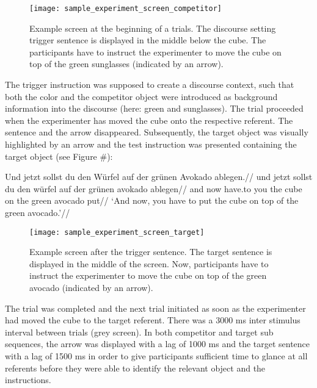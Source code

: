 \documentclass[
]{article}
\begin{document}
\begin{figure}[tbp]

{\centering \texttt{[image: sample\_experiment\_screen\_competitor]} 

}

\caption{Example screen at the beginning of a trials. The discourse setting trigger sentence is displayed in the middle below the cube. The participants have to instruct the experimenter to move the cube on top of the green sunglasses (indicated by an arrow).}\label{fig:image1}
\end{figure}

The trigger instruction was supposed to create a discourse context, such
that both the color and the competitor object were introduced as
background information into the discourse (here: green and sunglasses).
The trial proceeded when the experimenter has moved the cube onto the
respective referent. The sentence and the arrow disappeared.
Subsequently, the target object was visually highlighted by an arrow and
the test instruction was presented containing the target object (see
Figure \#):

\ex \begingl
\glpreamble Und jetzt sollst du den Würfel auf der grünen Avokado ablegen.//
\gla und jetzt sollst du den würfel auf der grünen avokado ablegen//
\glb and now have.to you the cube on the green avocado put//
\glft `And now, you have to put the cube on top of the green avocado.'//
\endgl \xe

\begin{figure}[tbp]

{\centering \texttt{[image: sample\_experiment\_screen\_target]} 

}

\caption{Example screen after the trigger sentence. The target sentence is displayed in the middle of the screen. Now, participants have to instruct the experimenter to move the cube on top of the green avocado (indicated by an arrow).}\label{fig:image2}
\end{figure}

The trial was completed and the next trial initiated as soon as the
experimenter had moved the cube to the target referent. There was a 3000
ms inter stimulus interval between trials (grey screen). In both
competitor and target sub sequences, the arrow was displayed with a lag
of 1000 ms and the target sentence with a lag of 1500 ms in order to
give participants sufficient time to glance at all referents before they
were able to identify the relevant object and the instructions.
\end{document}

